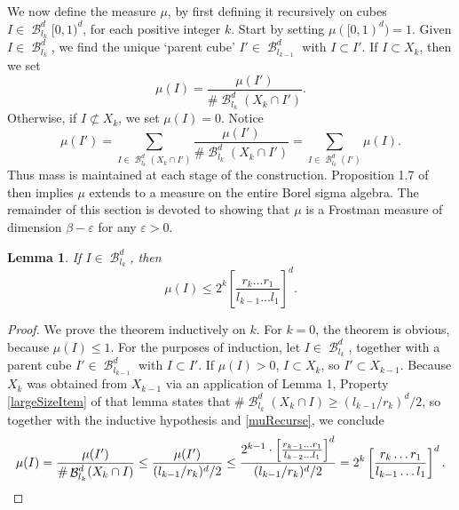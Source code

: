 \documentclass[dvipsnames,letterpaper,12pt]{article}
\numberwithin{equation}{section}
\theoremstyle{plain}
\newtheorem{lemma}{Lemma}
\theoremstyle{remark}
\DeclareMathOperator{\B}{\mathcal{B}}
\begin{document}
We now define the measure $\mu$, by first defining it recursively on cubes $I \in \B_{l_k}^d[0,1)^d$, for each positive integer $k$. Start by setting $\mu([0,1)^d) = 1$. Given $I \in \B^d_{l_k}$, we find the unique `parent cube' $I' \in \B^d_{l_{k-1}}$ with $I \subset I'$. If $I \subset X_k$, then we set
%
\begin{equation} \label{muRecurse} \mu(I) = \frac{\mu(I')}{\# \B^d_{l_k}(X_k \cap I')}. \end{equation}
%
Otherwise, if $I \not \subset X_k$, we set $\mu(I) = 0$. Notice
%
\[ \mu(I') = \sum_{I \in \B^d_{l_k}(X_k \cap I')} \frac{\mu(I')}{\# \B^d_{l_k}(X_k \cap I')} = \sum_{I \in \B^d_{l_k}(I')} \mu(I). \]
%
Thus mass is maintained at each stage of the construction. Proposition 1.7 of \cite{Falconer} then implies $\mu$ extends to a measure on the entire Borel sigma algebra. The remainder of this section is devoted to showing that $\mu$ is a Frostman measure of dimension $\beta - \varepsilon$ for any $\varepsilon > 0$.


\begin{lemma} \label{muBoundLemma}
	If $I \in \B^d_{l_k}$, then
	\begin{equation} \label{muBound}
		\mu(I) \leq 2^k \left[ \frac{r_k \dots r_1}{l_{k-1} \dots l_1} \right]^d.
	\end{equation}
\end{lemma}
\begin{proof}
	We prove the theorem inductively on $k$. For $k = 0$, the theorem is obvious, because $\mu(I) \leq 1$. For the purposes of induction, let $I \in \B^d_{l_k}$, together with a parent cube $I' \in \B^d_{l_{k-1}}$ with $I \subset I'$. If $\mu(I) > 0$, $I \subset X_k$, so $I' \subset X_{k-1}$. Because $X_k$ was obtained from $X_{k-1}$ via an application of Lemma 1, Property \ref{largeSizeItem} of that lemma states that $\# \B^d_{l_k}(X_k \cap I) \geq (l_{k-1}/r_k)^d/2$, so together with the inductive hypothesis and \eqref{muRecurse}, we conclude
	\[ \mu(I) = \frac{\mu(I')}{\# \B^d_{l_k}(X_k \cap I)} \leq \frac{\mu(I')}{(l_{k-1}/r_k)^d/2} \leq \frac{2^{k-1} \cdot \left[ \frac{r_{k-1} \dots r_1}{l_{k-2} \dots l_1} \right]^d}{(l_{k-1}/r_k)^d/2} = 2^k \left[ \frac{r_k \dots r_1}{l_{k-1} \dots l_1} \right]^d. \qedhere \]
\end{proof}
\end{document}
